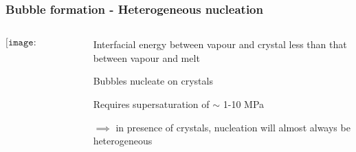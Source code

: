\documentclass{beamer}
\begin{document}
\begin{frame}
  \frametitle{Bubble formation - Heterogeneous nucleation}

  \begin{columns}[t]

    \begin{column}{0.5\paperwidth}

      \vspace{-0.5cm}
      
      $$\texttt{[image: hetero\_nuc.png]}$$

    \end{column}

    \begin{column}{0.5\paperwidth}

      Interfacial energy between vapour and crystal less than that between vapour and melt \\

      \vspace{1cm}

      Bubbles nucleate on crystals \\

      \vspace{1cm}

      Requires supersaturation of $\sim$ 1-10 MPa \\

      \vspace{1cm}

      $\implies$ in presence of crystals, nucleation will almost always be heterogeneous \\
    \end{column}
    
  \end{columns}
  
\end{frame}
\end{document}
